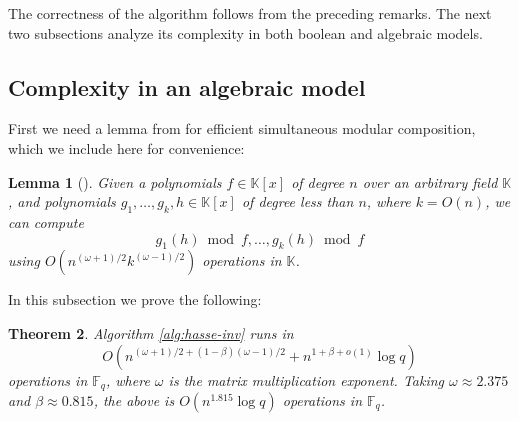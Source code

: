 \documentclass[12pt]{article}
\theoremstyle{plain}
\newtheorem{theorem}{Theorem}
\newtheorem{lemma}[theorem]{Lemma}
\theoremstyle{definition}
\def\F{\ensuremath{\mathbb{F}}}
\def\K{\ensuremath{\mathbb{K}}}
\begin{document}
The correctness of the algorithm follows from the preceding remarks. The next two subsections 
analyze its complexity in both boolean and algebraic models.


\subsection{Complexity in an algebraic model}

First we need a lemma from \cite{ks} for efficient simultaneous modular composition, which we 
include here for convenience:

\begin{lemma}[\cite{ks}]
	\label{lemma:ks}
	Given a polynomials $f \in \K[x]$ of degree $n$ over an arbitrary field $\K$, and polynomials 
	$g_1, \dots, g_k, h \in \K[x]$ of degree less than $n$, where $k = O(n)$, we can compute 
	\[ g_1(h) \bmod f, \dots, g_k(h) \bmod f \]
	using $O(n^{(\omega + 1) / 2} k^{(\omega - 1) / 2})$ operations in $\K$.
\end{lemma}

In this subsection we prove the following:

\begin{theorem}
	\label{theo:hasse-inv}
	Algorithm \ref{alg:hasse-inv} runs in
	\[O(n^{(\omega + 1) / 2 + (1 - \beta)(\omega - 1) / 2} + n^{1 + \beta + o(1)}\log q)\] 
	operations in $\F_q$, where $\omega$ is the matrix multiplication exponent. Taking $\omega 
	\approx	2.375$ and $\beta \approx 0.815$, the above is $O(n^{1.815}\log q)$ operations in 
	$\F_q$.
\end{theorem}
\end{document}
